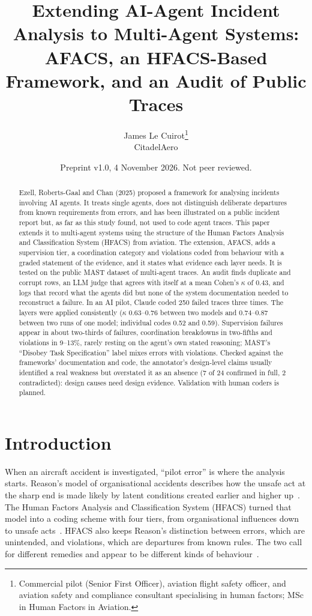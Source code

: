 \documentclass[11pt]{article}
\title{Extending AI-Agent Incident Analysis to Multi-Agent Systems: AFACS, an HFACS-Based Framework, and an Audit of Public Traces}
\author{James Le Cuirot\thanks{Commercial pilot (Senior First Officer), aviation flight safety officer, and aviation safety and compliance consultant specialising in human factors; MSc in Human Factors in Aviation.}\\[2pt] \normalsize CitadelAero}
\date{Preprint v1.0, 4 November 2026. Not peer reviewed.}
\begin{document}
\maketitle

\begin{abstract}
\noindent
Ezell, Roberts-Gaal and Chan (2025) proposed a framework for analysing incidents
involving AI agents. It treats single agents, does not distinguish deliberate
departures from known requirements from errors, and has been illustrated on a
public incident report but, as far as this study found, not used to code agent
traces.
This paper extends it to multi-agent systems using the structure of the Human
Factors Analysis and Classification System (HFACS) from aviation. The extension,
AFACS, adds a supervision tier, a coordination category and violations coded from
behaviour with a graded statement of the evidence, and it states what evidence
each layer needs. It is tested on the public MAST dataset of multi-agent traces.
An audit finds duplicate and corrupt rows, an LLM judge that agrees with itself at
a mean Cohen's $\kappa$ of 0.43, and logs that record what the agents did but
none of the system documentation needed to reconstruct a failure. In an AI pilot,
Claude coded 250 failed traces three times. The layers were applied consistently
($\kappa$ 0.63--0.76 between two models and 0.74--0.87 between two runs of one
model; individual codes 0.52 and 0.59). Supervision failures appear in about
two-thirds of failures, coordination breakdowns in two-fifths and violations in
9--13\%, rarely resting on the agent's own stated reasoning; MAST's ``Disobey Task
Specification'' label mixes errors with violations. Checked against the
frameworks' documentation and code, the annotator's design-level claims usually
identified a real weakness but overstated it as an absence (7 of 24 confirmed in
full, 2 contradicted): design causes need design evidence. Validation with human
coders is planned.
\end{abstract}

\section{Introduction}

When an aircraft accident is investigated, ``pilot error'' is where the analysis
starts. Reason's model of organisational accidents describes how the unsafe act
at the sharp end is made likely by latent conditions created earlier and higher
up~\cite{reason1990human,reason1997managing}. The Human Factors Analysis and
Classification System (HFACS) turned that model into a coding scheme with four
tiers, from organisational influences down to unsafe
acts~\cite{shappell2000hfacs,wiegmann2003human}. HFACS also keeps Reason's
distinction between errors, which are unintended, and violations, which are
departures from known rules. The two call for different remedies and appear to be
different kinds of behaviour~\cite{reason1990errors}.
\end{document}
